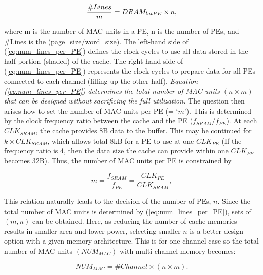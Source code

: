 \documentclass[pageno]{jpaper}
\begin{document}
\begin{equation}
	\frac{\#Lines}{m}=DRAM_{lat\-PE}\times n,
	\label{eq:num_lines_per_PE}
\end{equation}

where m is the number of MAC units in a PE, n is the number of PEs, and \#Lines is the (page\_size/word\_size). The left-hand side of (\ref{eq:num_lines_per_PE}) defines the clock cycles to use all data stored in the half portion (shaded) of the cache. The right-hand side of (\ref{eq:num_lines_per_PE}) represents the clock cycles to prepare data for all PEs connected to each channel (filling up the other half).\textit{ Equation (\ref{eq:num_lines_per_PE}) determines the total number of MAC units \begin{math}(n\times m)\end{math} that can be designed without sacrificing the full utilization.} The question then arises how to set the number of MAC units per PE (= $‘m’$). This is determined by the clock frequency ratio between the cache and the PE ($f_{SRAM}/ f_{PE}$). At each $CLK_{SRAM}$, the cache provides 8B data to the buffer. This may be continued for $k\times CLK_{SRAM}$, which allows total 8kB for a PE to use at one $CLK_{PE}$ (If the frequency ratio is 4, then the data size the cache can provide within one $CLK_{PE}$ becomes 32B). Thus, the number of MAC units per PE is constrained by

\begin{equation}
	m=\frac{f_{SRAM}}{f_{PE}}=\frac{CLK_{PE}}{CLK_{SRAM}},
	\label{eq:num_m}
\end{equation}

This relation naturally leads to the decision of the number of PEs, $n$. Since the total number of MAC units is determined by (\ref{eq:num_lines_per_PE}), sets of $(m, n)$ can be obtained. Here, as reducing the number of cache memories results in smaller area and lower power, selecting smaller $n$ is a better design option with a given memory architecture. This is for one channel case so the total number of MAC units $(NUM_{MAC})$ with multi-channel memory becomes:

\begin{equation}
	NUM_{MAC}=\#Channel\times(n\times m).
	\label{eq:num_mac}
\end{equation}
\end{document}
